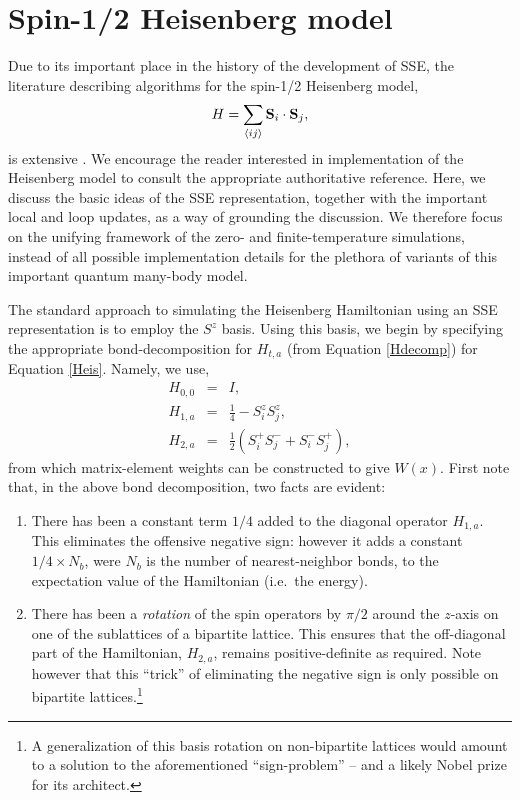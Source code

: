 \documentclass[vecphys]{svmult}
\begin{document}
\section{Spin-1/2 Heisenberg model} \label{Melko:HeisSec}

Due to its important place in the history of the development of SSE, the literature describing algorithms for the spin-1/2 Heisenberg model,
\begin{equation}
H = \sum_{\langle i j \rangle} {\bf S}_i \cdot {\bf S}_j, \label{Heis}
\end{equation}
is extensive \cite{Melko:Handscomb62, Melko:Henelius00, Melko:Sandvik91, Melko:Sandvik99,  Melko:SandvikHeis,Melko:Syljuasen02}.  We encourage the reader interested in implementation of the Heisenberg model to consult the appropriate authoritative reference. Here, we discuss the basic ideas of the SSE representation, together with the important local and loop updates, as a way of grounding the discussion.  We therefore focus on the unifying framework of the zero- and finite-temperature simulations, instead of all possible implementation details for the plethora of variants of this important quantum many-body model.

The  standard approach to simulating the Heisenberg Hamiltonian using an SSE representation is to employ the $S^z$ basis.  
Using this basis, we begin by specifying the appropriate bond-decomposition for $H_{t,a}$ (from Equation \ref{Hdecomp}) for Equation \ref{Heis}.
Namely, we use,
\begin{eqnarray}
H_{0,0} &=&I, \\
H_{1,a} &=& \frac{1}{4} - S^z_i S^z_j \label{H1a}, \label{diagB} \\
H_{2,a} &=& \frac{1}{2} (S^+_i S^-_j + S^-_i S^+_j), \label{odB}
\end{eqnarray}
from which matrix-element weights can be constructed to give $W(x)$.  First note that, in the above bond decomposition, two facts are evident:
\begin{enumerate}
\item There has been a constant term $1/4$ added to the diagonal operator $H_{1,a}$.  This eliminates the offensive negative sign: however it adds a constant $1/4 \times N_b$, were $N_b$ is the number of nearest-neighbor bonds, to the expectation value of the Hamiltonian (i.e.~the energy).
\item There has been a {\em rotation} of the spin operators by $\pi/2$ around the $z$-axis on one of the sublattices of a bipartite lattice.  This ensures that the off-diagonal part of the Hamiltonian, $H_{2,a}$, remains positive-definite as required.  Note however that this ``trick'' of eliminating the negative sign is only possible on bipartite lattices.\footnote{A generalization of this basis rotation on non-bipartite lattices would amount to a solution to the aforementioned ``sign-problem'' -- and a likely Nobel prize for its architect.}
\end{enumerate}
\end{document}
